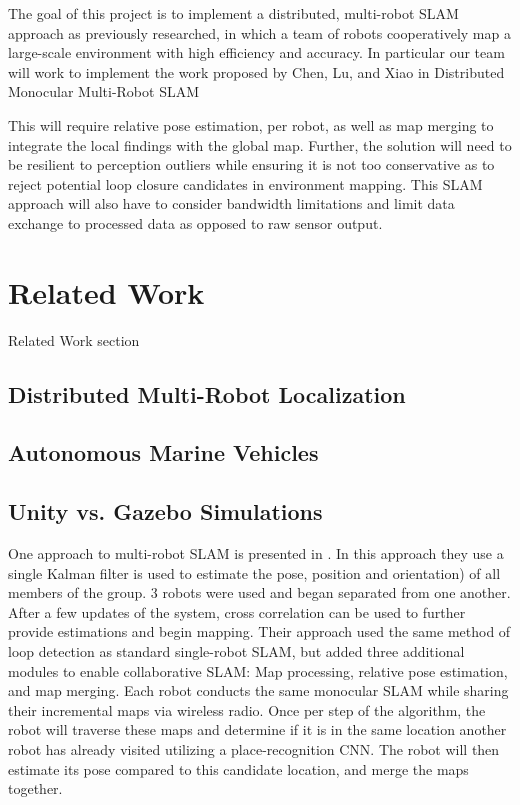 \documentclass[11pt, conference]{IEEEtran}
\begin{document}
The goal of this project is to implement a distributed, multi-robot SLAM approach as previously researched, in which a team of robots cooperatively map a large-scale environment with high efficiency and accuracy. In particular our team will work to implement the work proposed by Chen, Lu, and Xiao in Distributed Monocular Multi-Robot SLAM \cite{monocular}

This will require relative pose estimation, per robot, as well as map merging to integrate the local findings with the global map. Further, the solution will need to be resilient to perception outliers while ensuring it is not too conservative as to reject potential loop closure candidates in environment mapping. This SLAM approach will also have to consider bandwidth limitations and limit data exchange to processed data as opposed to raw sensor output. 


\section{Related Work}
Related Work section
\subsection{Distributed Multi-Robot Localization}
\subsection{Autonomous Marine Vehicles}
\subsection{Unity vs. Gazebo Simulations}

One approach to multi-robot SLAM is presented in \cite{1067998}. In this approach they use a single Kalman filter is used to estimate the pose, position and orientation) of all members of the group. 3 robots were used and began separated from one another. After a few updates of the system, cross correlation can be used to further provide estimations and begin mapping. Their approach used the same method of loop detection as standard single-robot SLAM, but added three additional modules to enable collaborative SLAM: Map processing, relative pose estimation, and map merging. Each robot conducts the same monocular SLAM while sharing their incremental maps via wireless radio. Once per step of the algorithm, the robot will traverse these maps and determine if it is in the same location another robot has already visited utilizing a place-recognition CNN. The robot will then estimate its pose compared to this candidate location, and merge the maps together.
\end{document}

